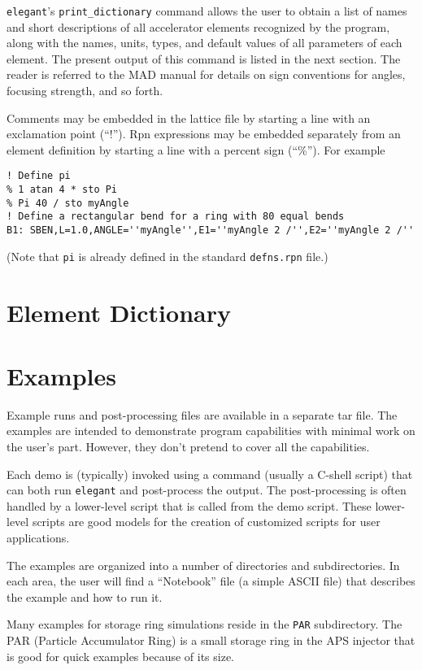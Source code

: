 \documentclass[11pt]{article}
\begin{document}
{\tt elegant}'s \verb|print_dictionary| command allows the user to
obtain a list of names and short descriptions of all accelerator
elements recognized by the program, along with the names, units,
types, and default values of all parameters of each element. 
The present output of this command is listed in the next section.
The reader is referred to the MAD manual\cite{MAD} for details on sign
conventions for angles, focusing strength, and so forth.  

Comments may be embedded in the lattice file by starting a line with 
an exclamation point (``!'').  Rpn expressions may be embedded separately
from an element definition by starting a line with a percent sign (``\%'').
For example
\begin{verbatim}
! Define pi
% 1 atan 4 * sto Pi
% Pi 40 / sto myAngle
! Define a rectangular bend for a ring with 80 equal bends
B1: SBEN,L=1.0,ANGLE=''myAngle'',E1=''myAngle 2 /'',E2=''myAngle 2 /''
\end{verbatim}
(Note that {\tt pi} is already defined in the standard {\tt defns.rpn} file.)

\newpage
\section{Element Dictionary}


\newpage
\section{Examples}

Example runs and post-processing files are available in a separate tar file.
The examples are intended to
demonstrate program capabilities with minimal work on the user's part.
However, they don't pretend to cover all the capabilities.

Each demo is (typically) invoked using a command (usually a C-shell
script) that can both run {\tt elegant} and post-process the output.
The post-processing is often handled by a lower-level script that is
called from the demo script.  These lower-level scripts are good
models for the creation of customized scripts for user applications.

The examples are organized into a number of directories and subdirectories.
In each area, the user will find a ``Notebook'' file (a simple ASCII file) that describes 
the example and how to run it.

Many examples for storage ring simulations reside in the {\tt PAR} subdirectory.
The PAR (Particle Accumulator Ring) is a small storage ring in the APS injector
that is good for quick examples because of its size.
\end{document}
